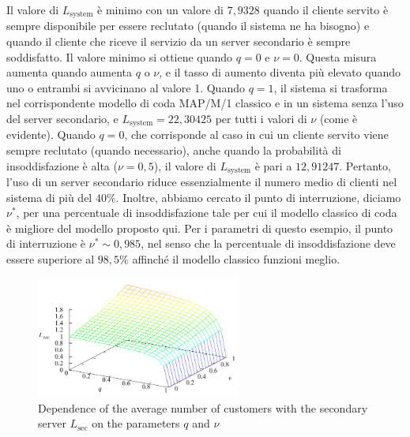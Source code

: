 \documentclass[11pt]{article}
\begin{document}
Il valore di $L_\mathrm{system}$ è minimo con un valore di $7,9328$ quando il cliente servito è sempre disponibile per essere reclutato (quando il sistema ne ha bisogno) e quando il cliente che riceve il servizio da un server secondario è sempre soddisfatto. Il valore minimo si ottiene quando $q = 0$ e $\nu = 0$. Questa misura aumenta quando aumenta $q$ o $\nu$, e il tasso di aumento diventa più elevato quando uno o entrambi si avvicinano al valore 1. Quando $q = 1$, il sistema si trasforma nel corrispondente modello di coda MAP/M/1 classico e in un sistema senza l'uso del server secondario, e $L_\mathrm{system} = 22,30425$ per tutti i valori di $\nu$ (come è evidente). Quando $q = 0$, che corrisponde al caso in cui un cliente servito viene sempre reclutato (quando necessario), anche quando la probabilità di insoddisfazione è alta ($\nu = 0,5$), il valore di $L_\mathrm{system}$ è pari a $12,91247$. Pertanto, l'uso di un server secondario riduce essenzialmente il numero medio di clienti nel sistema di più del $40\%$. Inoltre, abbiamo cercato il punto di interruzione, diciamo $\nu^*$, per una percentuale di insoddisfazione tale per cui il modello classico di coda è migliore del modello proposto qui. Per i parametri di questo esempio, il punto di interruzione è $\nu^* \sim 0,985$, nel senso che la percentuale di insoddisfazione deve essere superiore al $98,5\%$ affinché il modello classico funzioni meglio. \vspace{0.4cm}

\begin{figure}[h]
    \centering
    \includegraphics[width=0.6\textwidth]{0uFWo7C.png}
    \caption{Dependence of the average number of customers with the secondary server $L_\mathrm{sec}$ on the parameters $q$ and $\nu$}
    \label{fig:7}
\end{figure}
\end{document}
